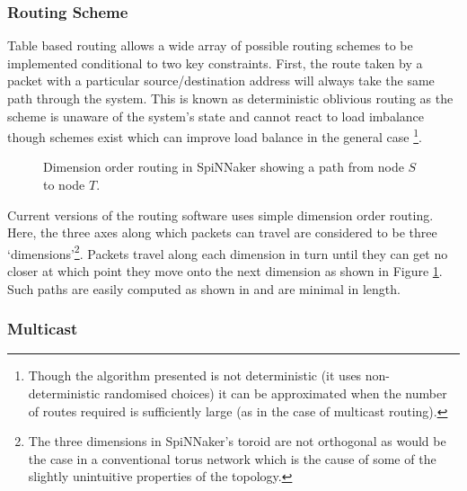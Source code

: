 			\subsubsection{Routing Scheme}
				
				
				Table based routing allows a wide array of possible routing schemes to
				be implemented conditional to two key constraints. First, the route
				taken by a packet with a particular source/destination address will
				always take the same path through the system. This is known as
				deterministic oblivious routing as the scheme is unaware of the system's
				state and cannot react to load imbalance though schemes exist which can
				improve load balance in the general case \cite{singh02}\footnote{Though
				the algorithm presented is not deterministic (it uses non-deterministic
				randomised choices) it can be approximated when the number of routes
				required is sufficiently large (as in the case of multicast routing).}.
				
				\begin{figure}
					\center
					
					\caption{Dimension order routing in SpiNNaker showing a path from node
					$S$ to node $T$.}
					\label{fig:dimension-order-routing}
				\end{figure}
				
				Current versions of the routing software uses simple dimension order
				routing. Here, the three axes along which packets can travel are
				considered to be three `dimensions'\footnote{The three dimensions in
				SpiNNaker's toroid are not orthogonal as would be the case in a
				conventional torus network which is the cause of some of the slightly
				unintuitive properties of the topology.}. Packets travel along each
				dimension in turn until they can get no closer at which point they move
				onto the next dimension as shown in Figure
				\ref{fig:dimension-order-routing}. Such paths are easily computed as
				shown in \cite{nocetti02} and are minimal in length.
			
			\subsubsection{Multicast}
				
				

